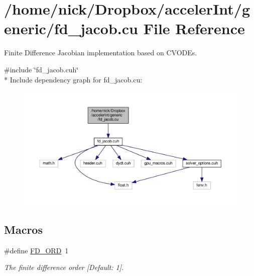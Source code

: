 \hypertarget{fd__jacob_8cu}{}\section{/home/nick/\+Dropbox/acceler\+Int/generic/fd\+\_\+jacob.cu File Reference}
\label{fd__jacob_8cu}


Finite Difference Jacobian implementation based on C\+V\+O\+D\+Es.  


{\ttfamily \#include \char`\"{}fd\+\_\+jacob.\+cuh\char`\"{}}\\*
Include dependency graph for fd\+\_\+jacob.\+cu\+:
\nopagebreak
\begin{figure}[H]
\begin{center}
\leavevmode
\includegraphics[width=350pt]{fd__jacob_8cu__incl}
\end{center}
\end{figure}
\subsection*{Macros}
\begin{DoxyCompactItemize}
\item 
\#define \hyperlink{fd__jacob_8cu_a5c00ed5d35f84424a9e4b2197bf21ac7}{F\+D\+\_\+\+O\+RD}~1
\begin{DoxyCompactList}\small\item\em The finite difference order \mbox{[}Default\+: 1\mbox{]}. \end{DoxyCompactList}\end{DoxyCompactItemize}
